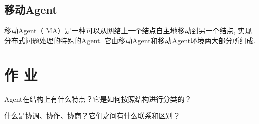 \subsection{移动Agent}
移动Agent（ MA）是一种可以从网络上一个结点自主地移动到另一个结点, 实现分布式问题处理的特殊的Agent. 它由移动Agent和移动Agent环境两大部分所组成.
\section{作 业}
\begin{think}
Agent在结构上有什么特点？它是如何按照结构进行分类的？
\end{think}
\begin{think}
什么是协调、协作、协商？它们之间有什么联系和区别？
\end{think}
